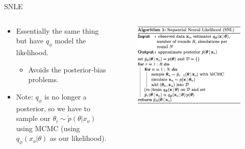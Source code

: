 \documentclass[12pt, aspectratio=169]{beamer}
\let\olditem\item
\renewcommand\item{\olditem\justifying}
\begin{document}

\begin{frame}{SNLE}
\begin{columns}
    \begin{column}{0.5\textwidth}
        \begin{itemize}[<+->]
            \item Essentially the same thing but have $q_\phi$ model the likelihood.
            \begin{itemize}
                \item Avoids the posterior-bias problems.
            \end{itemize}
                \item Note: $q_\phi$ is no longer a posterior, so we have to sample our $\theta_i \sim \tilde{p}(\theta | x_o)$ using MCMC (using $q_\phi (x_o | \theta)$ as our likelihood).
        \end{itemize}
    \end{column}
        
    \begin{column}{0.5\textwidth}
        \begin{figure}
            \centering
            \includegraphics[height=0.6\textheight]{"images/SNLE_algo2.png"}
            \caption{\cite{papamakarios_sequential_2019}}
        \end{figure}
    \end{column}
\end{columns}
    

\end{frame}
\end{document}
